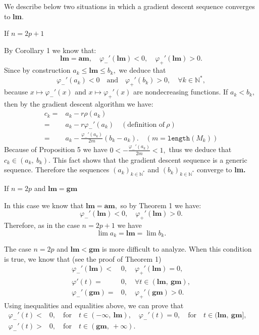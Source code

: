 \documentclass[
  11pt,
  a4paper,
]{article}
\newcommand\N{{\mathbb N}}
\begin{document}
We  describe below two situations in which a gradient descent sequence converges to \textbf{lm}.

 If $n=2p+1$\par

By Corollary 1 we know that:
\[
\mathbf{lm}=\mathbf{am},\quad \varphi_{-}'(\mathbf{lm})<0,\quad \varphi_{+}'(\mathbf{lm})>0.
\]
Since by construction $a_k\leq \mathbf{lm}\leq b_k,$ we deduce that
\[
\varphi_{-}'(a_k)<0 \quad\text{and}\quad \varphi_{+}'(b_k)>0,\quad \forall k\in \N^*,
\]
because $x\mapsto \varphi_{-}'(x)$ and $x\mapsto \varphi_{+}'(x)$ are nondecreasing functions.
If $a_k<b_k,$ then by the gradient descent algorithm we have:
\begin{align*}
	c_k=& a_k-r\rho(a_k)\\
	=& a_k-r\varphi_{-}'(a_k)\quad (\text{definition of}\ \rho )\\
	=& a_k -\frac{\varphi_{-}'(a_k)}{2m} (b_k-a_k).\quad  (m=\mathtt{length}( M_k))
\end{align*}
Because of Proposition 5 we have 
$0< -\frac{\varphi_{-}'(a_k)}{2m}<1,$ thus we deduce that $c_k \in (a_k,\ b_k).$  This fact shows that the gradient descent sequence
is a generic sequence. Therefore the sequences $\left(a_k\right)_{k\in \N^*}$ and $\left(b_k\right)_{k\in \N^*}$ converge
to \textbf{lm.}

 If $n=2p$ and $\mathbf{lm}=\mathbf{gm}$\par 
In this case we know that $\mathbf{lm}=\mathbf{am},$ so by Theorem 1 we have:
\[
\varphi_{-}'(\mathbf{lm})<0,\quad \varphi_{+}'(\mathbf{lm})>0.
\]
Therefore, as in the case $n=2p+1$ we have
\[
\lim a_k=\mathbf{lm}=\lim b_k.
\]  

The case $n=2p$ and $\mathbf{lm}<\mathbf{gm} $ is more difficult  to analyze. When this condition is true,
we know that (see the proof of Theorem 1) 
\begin{align*}
	\varphi_{-}'(\mathbf{lm})< & 0,\quad \varphi_{+}'(\mathbf{lm})=0,\\
	\varphi'(t)= &0,\quad \forall t\in (\mathbf{lm},\ \mathbf{gm}),\\
	\varphi_{-}'(\mathbf{gm})= & 0,\quad \varphi_{+}'(\mathbf{gm})>0.
\end{align*}
Using inequalities and equalities above, we can prove that
\begin{align*}
	\varphi_{-}'(t)< & 0,\quad \text{for}\quad t\in (-\infty,\ \mathbf{lm}),\quad  
	\varphi_{-}'(t)= 0,\quad \text{for}\quad t\in (\mathbf{lm},\ \mathbf{gm}],\quad\\
	\varphi_{-}'(t)> & 0,\quad \text{for}\quad t\in (\mathbf{gm},\ +\infty).
\end{align*}
\end{document}
